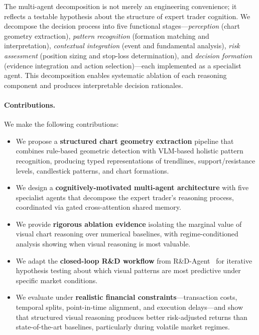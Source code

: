 The multi-agent decomposition is not merely an engineering convenience; it reflects a testable hypothesis about the structure of expert trader cognition. We decompose the decision process into five functional stages---\emph{perception} (chart geometry extraction), \emph{pattern recognition} (formation matching and interpretation), \emph{contextual integration} (event and fundamental analysis), \emph{risk assessment} (position sizing and stop-loss determination), and \emph{decision formation} (evidence integration and action selection)---each implemented as a specialist agent. This decomposition enables systematic ablation of each reasoning component and produces interpretable decision rationales.

\paragraph{Contributions.} We make the following contributions:
\begin{itemize}
    \item We propose a \textbf{structured chart geometry extraction} pipeline that combines rule-based geometric detection with VLM-based holistic pattern recognition, producing typed representations of trendlines, support/resistance levels, candlestick patterns, and chart formations.
    \item We design a \textbf{cognitively-motivated multi-agent architecture} with five specialist agents that decompose the expert trader's reasoning process, coordinated via gated cross-attention shared memory.
    \item We provide \textbf{rigorous ablation evidence} isolating the marginal value of visual chart reasoning over numerical baselines, with regime-conditioned analysis showing when visual reasoning is most valuable.
    \item We adapt the \textbf{closed-loop R\&D workflow} from R\&D-Agent~\cite{rdagent2025} for iterative hypothesis testing about which visual patterns are most predictive under specific market conditions.
    \item We evaluate under \textbf{realistic financial constraints}---transaction costs, temporal splits, point-in-time alignment, and execution delays---and show that structured visual reasoning produces better risk-adjusted returns than state-of-the-art baselines, particularly during volatile market regimes.
\end{itemize}
